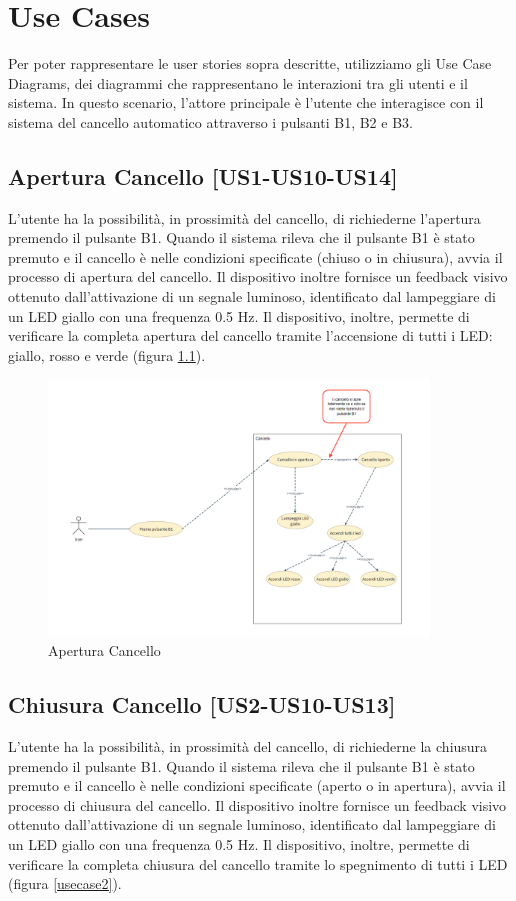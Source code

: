 \chapter{\bf{Use Cases}}

\noindent Per poter rappresentare le user stories sopra descritte, utilizziamo gli Use Case Diagrams, dei diagrammi che rappresentano le interazioni tra gli utenti e il sistema.
In questo scenario, l'attore principale è l'utente che  interagisce con il sistema del cancello automatico attraverso i pulsanti B1, B2 e B3.


\section{Apertura Cancello [US1-US10-US14]}
L'utente ha la possibilità, in prossimità del cancello, di richiederne l'apertura premendo il pulsante B1. Quando il sistema rileva che il pulsante B1 è stato premuto e il cancello è nelle condizioni specificate (chiuso o in chiusura), avvia il processo di apertura del cancello. Il dispositivo inoltre fornisce un feedback visivo ottenuto dall'attivazione di un segnale luminoso, identificato dal lampeggiare di un LED giallo con una frequenza 0.5 Hz.
Il dispositivo, inoltre, permette di verificare la completa apertura del cancello tramite l'accensione di tutti i LED: giallo, rosso e verde (figura \ref{usecase1}).

\begin{figure}[H]
    \centering
    \includegraphics[width=0.9\textwidth]{figures/usecase_1.png}
    \caption{Apertura Cancello}
    \label{usecase1}
\end{figure}


\section{Chiusura Cancello [US2-US10-US13]}
L'utente ha la possibilità, in prossimità del cancello, di richiederne la chiusura premendo il pulsante B1. Quando il sistema rileva che il pulsante B1 è stato premuto e il cancello è nelle condizioni specificate (aperto o in apertura), avvia il processo di chiusura del cancello. Il dispositivo inoltre fornisce un feedback visivo ottenuto dall'attivazione di un segnale luminoso, identificato dal lampeggiare di un LED giallo con una frequenza 0.5 Hz.
Il dispositivo, inoltre, permette di verificare la completa chiusura del cancello tramite lo spegnimento di tutti i LED (figura \ref{usecase2}).

